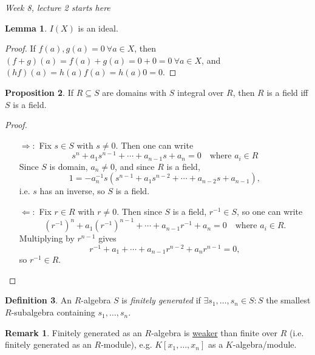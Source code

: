 \documentclass[a4paper]{article}
\theoremstyle{definition}
\newtheorem{defn}{Definition}[subsection]
\newtheorem{prop}[defn]{Proposition}
\newtheorem{lemma}[defn]{Lemma}
\newtheorem*{remark}{Remark}
\begin{document}
\begin{flushright}
\textit{Week 8, lecture 2 starts here}
\end{flushright}

\begin{lemma}
$I(X)$ is an ideal.
\end{lemma}
\begin{proof}
If $f(a),g(a)=0 \ \forall a\in X$, then $(f+g)(a)=f(a)+g(a)=0+0=0 \ \forall a\in X$, and $(hf)(a)=h(a)f(a)=h(a)0=0$.
\end{proof}

\begin{prop}
\label{prop:SintRthenRfieldiffSfield}
If $R\subseteq S$ are domains with $S$ integral over $R$, then $R$ is a field iff $S$ is a field.
\end{prop}
\begin{proof}
\begin{itemize}
\item[$\Rightarrow:$] Fix $s\in S$ with $s\neq 0$. Then one can write
\[
s^n+a_1s^{n-1}+\cdots+a_{n-1}s+a_n=0\quad\text{where }a_i\in R
\]
Since $S$ is domain, $a_n\neq 0$, and since $R$ is a field,
\[
1=-a_n^{-1}s\left(s^{n-1}+a_1s^{n-2}+\cdots+a_{n-2}s+a_{n-1}\right),
\]
i.e. $s$ has an inverse, so $S$ is a field.
\item[$\Leftarrow:$] Fix $r\in R$ with $r\neq 0$. Then since $S$ is a field, $r^{-1}\in S$, so one can write
\[
\left(r^{-1}\right)^n+a_1\left(r^{-1}\right)^{n-1}+\cdots+a_{n-1}r^{-1}+a_n=0\quad\text{where }a_i\in R.
\]
Multiplying by $r^{n-1}$ gives
\[
r^{-1}+a_1+\cdots+a_{n-1}r^{n-2}+a_nr^{n-1}=0,
\]
so $r^{-1}\in R$.
\end{itemize}
\end{proof}

\begin{defn}
An $R$-algebra $S$ is \textit{finitely generated} if $\exists s_1,\ldots,s_n\in S:S$ the smallest $R$-subalgebra containing $s_1,\ldots,s_n$.
\end{defn}
\begin{remark}
Finitely generated as an $R$-algebra is \underline{weaker} than finite over $R$ (i.e. finitely generated as an $R$-module), e.g. $K[x_1,\ldots,x_n]$ as a $K$-algebra/module.
\end{remark}
\end{document}
